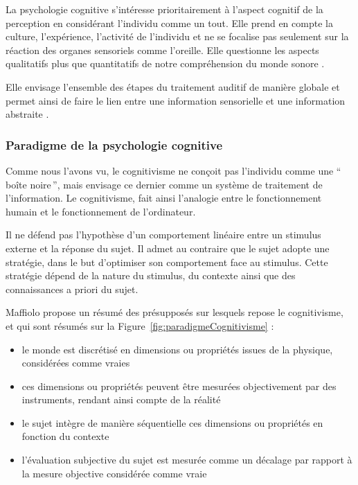La psychologie cognitive s'intéresse prioritairement à l'aspect cognitif de la perception en considérant l'individu comme un tout. Elle prend en compte la culture, l'expérience, l'activité de l'individu et ne se focalise pas seulement sur la réaction des organes sensoriels comme l'oreille. Elle questionne les aspects qualitatifs plus que quantitatifs de notre compréhension du monde sonore \citep[p. ??]{maffiolo_caracterisation_1999}.

Elle envisage l'ensemble des étapes du traitement auditif de manière globale et permet ainsi de faire le lien entre une information sensorielle et une information abstraite \citep{mcadams1994penser}.

\subsubsection{Paradigme de la psychologie cognitive}

Comme nous l'avons vu, le cognitivisme ne conçoit pas l'individu comme une ``\,boîte noire\,'', mais envisage ce dernier comme un système de traitement de l'information. Le cognitivisme, fait ainsi l'analogie entre le fonctionnement humain et le fonctionnement de l'ordinateur.

Il ne défend pas l'hypothèse d'un comportement linéaire entre un stimulus externe et la réponse du sujet. Il admet au contraire que le sujet adopte une stratégie, dans le but d'optimiser son comportement face au stimulus. Cette stratégie dépend de la nature du stimulus, du contexte ainsi que des connaissances a priori du sujet.

Maffiolo propose un résumé des présupposés sur lesquels repose le cognitivisme, et qui sont résumés sur la Figure~\ref{fig:paradigmeCognitivisme} \citep[p. ??]{maffiolo_caracterisation_1999} :

\begin{itemize}
\item le monde est discrétisé en dimensions ou propriétés issues de la physique, considérées comme vraies
\item ces dimensions ou propriétés peuvent être mesurées objectivement par des instruments, rendant ainsi compte de la réalité
\item le sujet intègre de manière séquentielle ces dimensions ou propriétés en fonction du contexte
\item l'évaluation subjective du sujet est mesurée comme un décalage par rapport à la mesure objective considérée comme vraie
\end{itemize}

